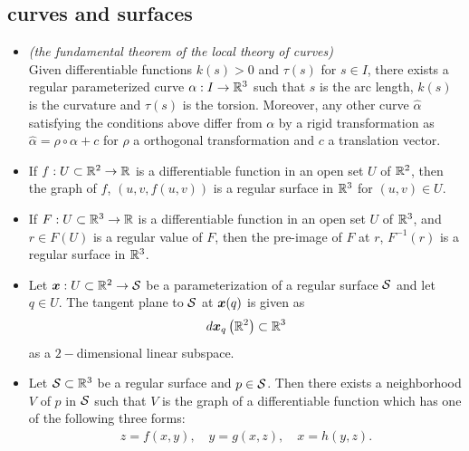 \documentclass[11pt]{article}
\begin{document}
\subsection{curves and surfaces}
\begin{itemize}
\item 
\begin{theorem}\label{th: curv_tri}
\emph{(the fundamental theorem of the local theory of curves)}\\
Given differentiable functions $k(s)>0$ and $\tau(s)$ for $s\in I$, there exists a regular parameterized curve $\alpha: I\rightarrow {\mathbb R}^{3}$ such that $s$ is the arc length, $k(s)$ is the curvature and $\tau(s)$ is the torsion. Moreover, any other curve $\hat{\alpha}$ satisfying the conditions above differ from $\alpha$ by a rigid transformation as $\hat{\alpha} = \rho\circ \alpha + c$ for $\rho$ a orthogonal transformation and $c$ a translation vector. 
\end{theorem}\vspace{5pt}

\item \begin{theorem}\label{th: surf_difffun}
If $f: U\subset {\mathbb R}^{2} \rightarrow {\mathbb R}$ is a differentiable function in an open set $U$ of ${\mathbb R}^{2}$, then the graph of $f$, $(u,v, f(u,v))$ is a regular surface in ${\mathbb R}^{3}$ for $(u,v) \in U$.
\end{theorem}

\item  \begin{theorem}\label{th: surf_regval}
If $F: U \subset {\mathbb R}^{3} \rightarrow {\mathbb R}$ is a differentiable function in an open set $U$ of ${\mathbb R}^{3}$, and $r\in F(U)$ is a regular value of $F$,  then the pre-image of $F$ at $r$, $F^{-1}(r)$ is a regular surface in ${\mathbb R}^{3}$.
\end{theorem}\vspace{5pt}

\item \begin{proposition}\label{prop: tang_param}
Let $\boldsymbol{x}: U\subset {\mathbb R}^{2} \rightarrow {\mathcal S}$ be a parameterization of a regular surface ${\mathcal S}$ and let $q\in U$. The tangent plane to ${\mathcal S}$ at $\boldsymbol{x}(q)$ is given as 
\begin{align*}
d\boldsymbol{x}_{q}\left({\mathbb R}^{2}\right) \subset {\mathbb R}^{3}
\end{align*} as a $2-$dimensional linear subspace.
\end{proposition}


\item \begin{proposition}\label{prop: local_diff_fun}
Let ${\mathcal S}\subset {\mathbb R}^{3}$ be a regular surface and $p\in {\mathcal S}$. Then there exists a neighborhood $V$ of $p$ in ${\mathcal S}$ such that $V$ is the graph of a differentiable function which has one of the following three forms: 
\begin{align*}
z = f(x,y),\quad y= g(x,z), \quad x= h(y,z). 
\end{align*}
\end{proposition}



\end{itemize}
\end{document}

